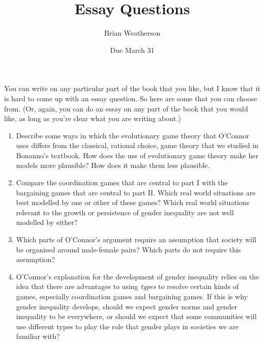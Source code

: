 \documentclass[
  11pt,
]{article}
\title{Essay Questions}
\author{Brian Weatherson}
\date{Due March 31}
\providecommand{\tightlist}{%
  \setlength{\itemsep}{0pt}\setlength{\parskip}{0pt}}
\begin{document}
\maketitle

You can write on any particular part of the book that you like, but I
know that it is hard to come up with an essay question. So here are some
that you can choose from. (Or, again, you can do an essay on any part of
the book that you would like, as long as you're clear what you are
writing about.)

\begin{enumerate}
\def\labelenumi{\arabic{enumi}.}
\tightlist
\item
  Describe some ways in which the evolutionary game theory that O'Connor
  uses differs from the classical, rational choice, game theory that we
  studied in Bonanno's textbook. How does the use of evolutionary game
  theory make her models more plausible? How does it make them less
  plausible.
\item
  Compare the coordination games that are central to part I with the
  bargaining games that are central to part II. Which real world
  situations are best modelled by one or other of these games? Which
  real world situations relevant to the growth or persistence of gender
  inequality are not well modelled by either?
\item
  Which parts of O'Connor's argument require an assumption that society
  will be organised around male-female pairs? Which parts do not require
  this assumption?
\item
  O'Connor's explanation for the development of gender inequality relies
  on the idea that there are advantages to using \emph{types} to resolve
  certain kinds of games, especially coordination games and bargaining
  games. If this is why gender inequality develops, should we expect
  gender norms and gender inequality to be everywhere, or should we
  expect that some communities will use different types to play the role
  that gender plays in societies we are familiar with?
\end{enumerate}
\end{document}
